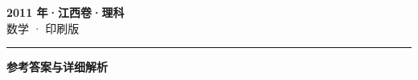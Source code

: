 \documentclass[zihao=5, a4paper]{ctexart}
\begin{document}
\begin{center}
  {\Large\bfseries 2011 年·江西卷·理科}\\[4pt]
  {\large 数学 · 印刷版}
\end{center}
\medskip
{}

\par\bigskip\hrule\bigskip
{}
\begin{center}{\large\bfseries 参考答案与详细解析}\end{center}
\smallskip

\end{document}
